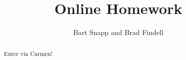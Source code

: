\documentclass[handout,space,nooutcomes]{xourse}
\title{Online Homework}
\author{Bart Snapp and Brad Findell}
\begin{document}
\begin{abstract}
Enter via Carmen!
\end{abstract}
\maketitle

{}
\end{document}

